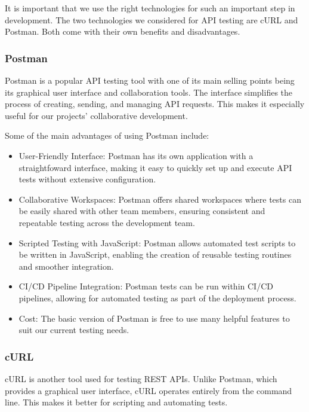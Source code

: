 \documentclass[12pt]{article}
\begin{document}
It is important that we use the right technologies for such an important step in development. The two technologies we considered for API testing are cURL and Postman. Both come with their own benefits and disadvantages.

\subsubsection{Postman}
Postman is a popular API testing tool with one of its main selling points being its graphical user interface and collaboration tools. The interface simplifies the process of creating, sending, and managing API requests. This makes it especially useful for our projects’ collaborative development.

Some of the main advantages of using Postman include:
\begin{itemize}
\item User-Friendly Interface: Postman has its own application with a straightfoward interface, making it easy to quickly set up and execute API tests without extensive configuration.
\item Collaborative Workspaces: Postman offers shared workspaces where tests can be easily shared with other team members, ensuring consistent and repeatable testing across the development team.
\item Scripted Testing with JavaScript: Postman allows automated test scripts to be written in JavaScript, enabling the creation of reusable testing routines and smoother integration.
\item CI/CD Pipeline Integration: Postman tests can be run within CI/CD pipelines, allowing for automated testing as part of the deployment process.
\item Cost: The basic version of Postman is free to use many helpful features to suit our current testing needs.
\end{itemize}

\subsubsection{cURL}
cURL is another tool used for testing REST APIs. Unlike Postman, which provides a graphical user interface, cURL operates entirely from the command line. This makes it better for scripting and automating tests.
\end{document}

